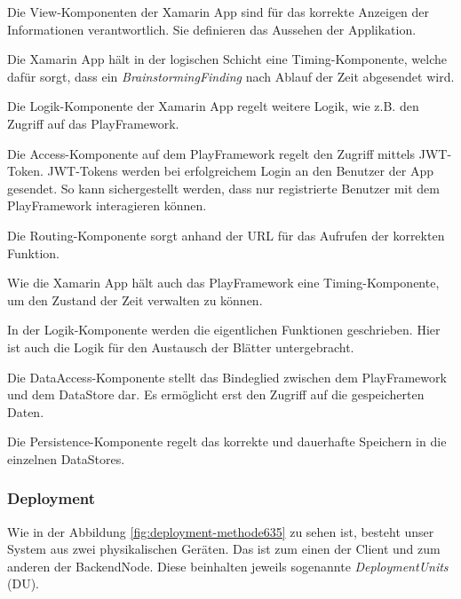 \begin{description}[leftmargin=!,labelwidth=\widthof{\bfseries DataAccessComponent}]
	\item[ViewComponent] Die View-Komponenten der Xamarin App sind für das korrekte Anzeigen der Informationen verantwortlich. Sie definieren das Aussehen der Applikation.
	\item[AppTimingComponent] Die Xamarin App hält in der logischen Schicht eine Timing-Komponente, welche dafür sorgt, dass ein \textit{BrainstormingFinding} nach Ablauf der Zeit abgesendet wird.
	\item[AppLogicComponent] Die Logik-Komponente der Xamarin App regelt weitere Logik, wie z.B. den Zugriff auf das PlayFramework.
	\item[AccessComponent] Die Access-Komponente auf dem PlayFramework regelt den Zugriff mittels JWT-Token\cite{jwt}. JWT-Tokens werden bei erfolgreichem Login an den Benutzer der App gesendet. So kann sichergestellt werden, dass nur registrierte Benutzer mit dem PlayFramework interagieren können.
	\item[Routing] Die Routing-Komponente sorgt anhand der URL für das Aufrufen der korrekten Funktion.
	\item[TimingComponent] Wie die Xamarin App hält auch das PlayFramework eine Timing-Komponente, um den Zustand der Zeit verwalten zu können.
	\item[LogicComponent] In der Logik-Komponente werden die eigentlichen Funktionen geschrieben. Hier ist auch die Logik für den Austausch der Blätter untergebracht.
	\item[DataAccessComponent] Die DataAccess-Komponente stellt das Bindeglied zwischen dem PlayFramework und dem DataStore dar. Es ermöglicht erst den Zugriff auf die gespeicherten Daten.
	\item[PersistenceComponent] Die Persistence-Komponente regelt das korrekte und dauerhafte Speichern in die einzelnen DataStores.
\end{description}


\subsubsection{Deployment}
Wie in der Abbildung \ref{fig:deployment-methode635} zu sehen ist, besteht unser System aus zwei physikalischen Geräten. Das ist zum einen der Client und zum anderen der BackendNode. Diese beinhalten jeweils sogenannte \textit{DeploymentUnits} (DU). 


